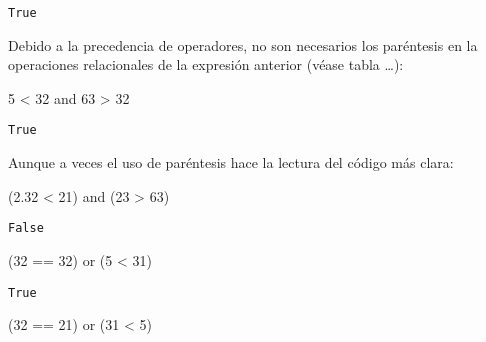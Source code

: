 \documentclass[
  letterpaper,
  DIV=11,
  numbers=noendperiod]{scrreprt}
\newenvironment{Shaded}{\begin{snugshade}}{\end{snugshade}}
\newcommand{\DecValTok}[1]{\textcolor[rgb]{0.68,0.00,0.00}{#1}}
\newcommand{\FloatTok}[1]{\textcolor[rgb]{0.68,0.00,0.00}{#1}}
\newcommand{\KeywordTok}[1]{\textcolor[rgb]{0.00,0.23,0.31}{#1}}
\newcommand{\NormalTok}[1]{\textcolor[rgb]{0.00,0.23,0.31}{#1}}
\newcommand{\OperatorTok}[1]{\textcolor[rgb]{0.37,0.37,0.37}{#1}}
\begin{document}
\begin{verbatim}
True
\end{verbatim}

Debido a la precedencia de operadores, no son necesarios los paréntesis
en la operaciones relacionales de la expresión anterior (véase tabla
\ldots):

\begin{Shaded}
\begin{Highlighting}[]
\DecValTok{5} \OperatorTok{\textless{}} \DecValTok{32} \KeywordTok{and} \DecValTok{63} \OperatorTok{\textgreater{}} \DecValTok{32}
\end{Highlighting}
\end{Shaded}

\begin{verbatim}
True
\end{verbatim}

Aunque a veces el uso de paréntesis hace la lectura del código más
clara:

\begin{Shaded}
\begin{Highlighting}[]
\NormalTok{(}\FloatTok{2.32} \OperatorTok{\textless{}} \DecValTok{21}\NormalTok{) }\KeywordTok{and}\NormalTok{ (}\DecValTok{23} \OperatorTok{\textgreater{}} \DecValTok{63}\NormalTok{)}
\end{Highlighting}
\end{Shaded}

\begin{verbatim}
False
\end{verbatim}

\begin{Shaded}
\begin{Highlighting}[]
\NormalTok{(}\DecValTok{32} \OperatorTok{==} \DecValTok{32}\NormalTok{) }\KeywordTok{or}\NormalTok{ (}\DecValTok{5} \OperatorTok{\textless{}} \DecValTok{31}\NormalTok{)}
\end{Highlighting}
\end{Shaded}

\begin{verbatim}
True
\end{verbatim}

\begin{Shaded}
\begin{Highlighting}[]
\NormalTok{(}\DecValTok{32} \OperatorTok{==} \DecValTok{21}\NormalTok{) }\KeywordTok{or}\NormalTok{ (}\DecValTok{31} \OperatorTok{\textless{}} \DecValTok{5}\NormalTok{) }
\end{Highlighting}
\end{Shaded}
\end{document}
